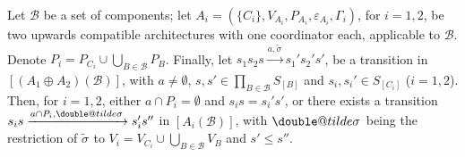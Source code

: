 \documentclass{llncs}
\makeatletter
\newcommand{\cB}{\ensuremath{\mathcal{B}}}
\newcommand{\goesto}[2][]{\ensuremath{\xrightarrow[#1]{#2}}}
\newcommand{\val}[3][]{\ensuremath{#1{\sigma}^{#2}_{#3}}}
\newcommand{\export}[1][]{\ensuremath{\varepsilon_{#1}}}
\newcommand{\semopen}[1]{\ensuremath{[{#1}]}}
\newcommand{\arcomp}{\oplus}
\newcommand{\order}{\leqslant}
\newcommand{\doubletilde}[1]{{%
  \mathpalette\double@tilde{#1}%
}}
\newcommand{\double@tilde}[2]{%
  \sbox\z@{$\m@th#1\tilde{#2}$}%
  \ht\z@=.9\ht\z@
  \tilde{\box\z@}%
}
\makeatother
\begin{document}
\begin{lemma}
  \label{lem:onestep}
  Let $\cB$ be a set of components; let $A_i = (\{C_i\}, V_{A_i},
  P_{A_i}, \export[A_i], \Gamma_i)$, for $i = 1,2$, be two upwards compatible architectures
  with one coordinator each, applicable to $\cB$.  Denote
  $P_i = P_{C_i} \cup \bigcup_{B \in \cB} P_B$.
  Finally, let
%
  $
  s_1 s_2 s
%
  \goesto{a, \tilde{\val{}{}}}
%
  s_1' s_2' s'
  $,
%
  be a transition in $\semopen{(A_1 \arcomp A_2)(\cB)}$, with
  $a \neq \emptyset$, 
  $s, s' \in \prod_{B \in \cB} S_{\semopen{B}}$
  and
  $s_i, s_i' \in S_{\semopen{C_i}}$ ($i=1,2$).
%
  Then, for $i=1,2$, either $a \cap P_i = \emptyset$ and $s_i s=
  s_i' s'$, or there exists a transition
%
  $
  s_i s
%
  \goesto{a \cap P_i, \val[\doubletilde]{}{}}
%
  s_i' s''
  $ 
%
  in $\semopen{A_i(\cB)}$, with
  $\val[\doubletilde]{}{}$ being the restriction of
  $\val[\tilde]{}{}$ to
  $V_i = V_{C_i} \cup \bigcup_{B \in \cB} V_B$ and
  $s' \order s''$.
\end{lemma}
%
\end{document}
